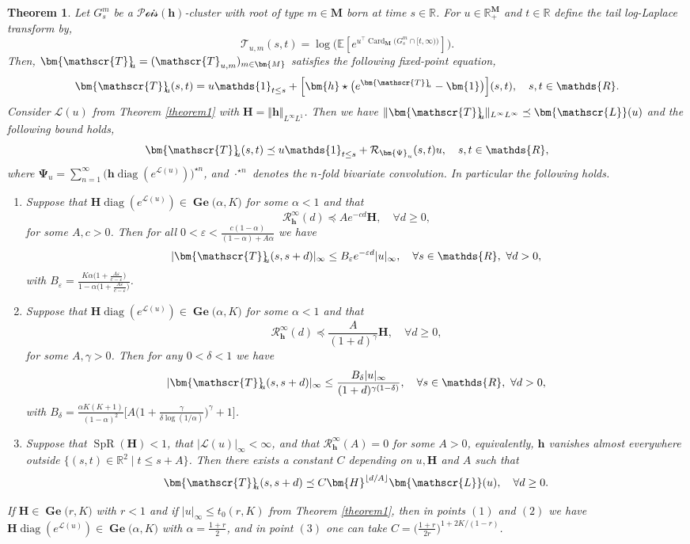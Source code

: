 \documentclass[reqno,final,11pt]{amsart}
\theoremstyle{plain}
\newtheorem{theorem}{Theorem}[section]
\theoremstyle{definition}
\theoremstyle{remark}
\newcommand{\R}{\mathds{R}}
\newcommand{\ind}{\mathds{1}}
\newcommand{\E}[1]{\mathds{E}\left[#1\right]}
\newcommand{\M}{\bm{M}}
\newcommand{\Ge}[2]{\bm{\Gel(} #1,#2 \bm{)} }
\renewcommand{\L}{\bm{\mathscr{L}}}
\newcommand{\ones}{\bm{1}}
\newcommand{\h}{\bm{h}}
\newcommand{\Ta}{\mathscr{T}}
\newcommand{\bTa}[1]{\bm{\mathscr{T}}_{\mkern-7mu #1}}
\renewcommand{\H}{\bm{H}}
\newcommand{\Vityty}[1]{\Vert #1 \Vert_{L^{\infty}L^{\infty}}}
\newcommand{\Vityone}[1]{\Vert #1 \Vert_{L^{\infty}L^{1}}}
\newcommand{\pos}{\R_+^{\M}}
\newcommand{\Pois}{\mathscr{P}\!\mathscr{o}\!\mathscr{i}\!\mathscr{s}}
\newcommand{\Res}{\mathcal{R}}
\newcommand{\trp}{^{\intercal}}
\DeclareMathOperator{\card}{Card}
\DeclareMathOperator{\diag}{diag}
\DeclareMathOperator{\spr}{SpR}
\DeclareMathOperator{\Gel}{Ge}
\begin{document}
\begin{theorem}\label{theorem4.5}
    Let $G_s^m$ be a $\Pois(\h)$-cluster with root of type $m\in\M$ born at time $s\in\R$. For $u\in \pos$ and $t\in\R$ define the tail log-Laplace transform by,
\[\Ta_{u,m}(s,t) = \log\bigg( \E{e^{u\trp \card_{\M}\big(G^{m}_{s} \cap [t,\infty)\big)}} \bigg).\]
Then, $\bTa{u}=(\Ta_{u,m})_{m\in\M}$ satisfies the following fixed-point equation,
\begin{equation}\label{eq4.2}
        \bTa{u}(s,t) =  u \ind_{t\leq s}  + \Big[\h \star \big(e^{\bTa{u}}-\ones \big)\Big](s,t), \quad s,t\in\R.
\end{equation}
	Consider $\L(u)$ from Theorem \ref{theorem1} with $\H = \Vityone{\h}$. Then we have $\Vityty{\bTa{u}} \preceq \L(u)$ and the following bound holds,
	\begin{equation}\label{eq4.3}
		\bTa{u}(s,t) \preceq  u \ind_{t\leq s} + \Res_{\bm{\Psi}_u}(s,t) u, \quad s,t\in\R,
	\end{equation}
where $\displaystyle \bm{\Psi}_u = \sum_{n=1}^{\infty}\big( \h \diag(e^{\L(u)}) \big)^{\star n}$, and $\cdot^{\star n}$ denotes the $n$-fold bivariate convolution. In particular the following holds.
\begin{enumerate}
	\item Suppose that $\H \diag(e^{\L(u)}) \in \Ge{\alpha}{K}$ for some $\alpha <1$ and that \[\Res_{\h}^{\infty}(d) \preceq A e^{-cd} \H, \quad \forall d\geq 0,\] for some $A,c>0$. Then for all $0<\varepsilon< \frac{c(1-\alpha)}{(1-\alpha)+A\alpha}$ we have \[\vert\bTa{u}(s,s+d)\vert_{\infty} \leq   B_{\varepsilon} e^{-\varepsilon d} \vert u \vert_{\infty}, \quad \forall s\in\R, \ \forall d>0,\]
	with $B_{\varepsilon}= \frac{K\alpha\big(1+\frac{A\varepsilon}{c-\varepsilon}\big)}{1-\alpha\big(1+\frac{A\varepsilon}{c-\varepsilon}\big)}$. 
	\item Suppose that $\H \diag(e^{\L(u)}) \in \Ge{\alpha}{K}$ for some $\alpha <1$ and that \[\Res_{\h}^{\infty}(d) \preceq \frac{A}{(1+d)^{\gamma}}\H, \quad \forall d \geq 0,\] for some $A,\gamma>0$. Then for any $0<\delta<1$ we have \[\vert\bTa{u}(s,s+d)\vert_{\infty} \leq \frac{B_{\delta} \vert u\vert_{\infty}}{(1+d)^{\gamma(1-\delta)}}, \quad \forall s\in\R, \ \forall d> 0,\]
	with $B_{\delta}=\frac{\alpha K(K+1) }{(1-\alpha)^2}  \Big[A\big(1+\frac{\gamma}{\delta\log(1/\alpha)}\big)^{\gamma}+1\Big]$. 
	\item Suppose that $\spr(\H)<1$, that $\vert \L(u)\vert_{\infty}<\infty$, and that $\Res_{\h}^{\infty}(A) = 0$ for some $A>0$, equivalently, $\h$ vanishes almost everywhere outside $\{(s,t)\in\R^2\mid t\leq s+A\}$. Then there exists a constant $C$ depending on $u,\H$ and $A$ such that \[\bTa{u}(s,s+d) \preceq C \H^{\lfloor d/A \rfloor} \L(u), \quad \forall d\geq 0.\]
\end{enumerate}
If $\H\in\Ge{r}{K}$ with $r<1$ and if $\vert u\vert_{\infty} \leq t_0(r,K)$ from Theorem \ref{theorem1}, then in points $(1)$ and $(2)$ we have $\H \diag(e^{\L(u)}) \in \Ge{\alpha}{K}$ with $\alpha = \frac{1+r}{2}$, and in point $(3)$ one can take $C = \big(\frac{1+r}{2r}\big)^{1+2K/(1-r)}$.
\end{theorem}
\end{document}
